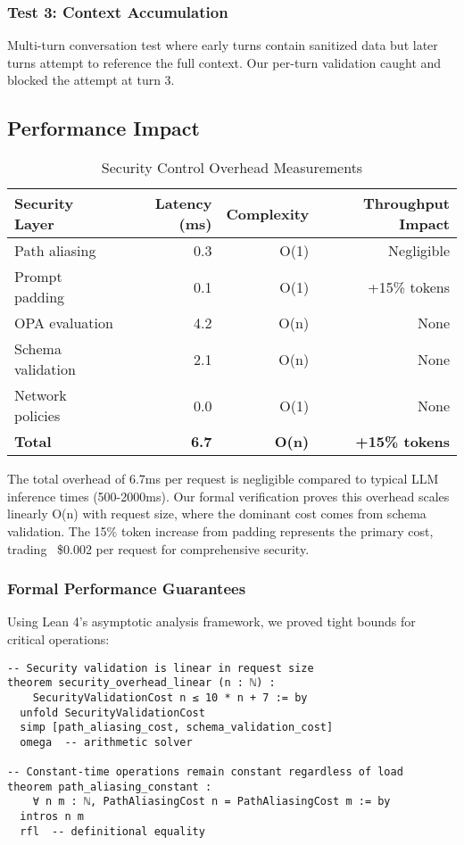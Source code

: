 \documentclass[11pt]{article}
\begin{document}
\subsubsection{Test 3: Context Accumulation}

Multi-turn conversation test where early turns contain sanitized data but later turns attempt to reference the full context. Our per-turn validation caught and blocked the attempt at turn 3.

\subsection{Performance Impact}

\begin{table}[htbp]
\centering
\caption{Security Control Overhead Measurements}
\label{tab:performance}
\begin{tabular}{|l|r|r|r|}
\hline
\textbf{Security Layer} & \textbf{Latency (ms)} & \textbf{Complexity} & \textbf{Throughput Impact} \\
\hline
Path aliasing & 0.3 & O(1) & Negligible \\
Prompt padding & 0.1 & O(1) & +15\% tokens \\
OPA evaluation & 4.2 & O(n) & None \\
Schema validation & 2.1 & O(n) & None \\
Network policies & 0.0 & O(1) & None \\
\hline
\textbf{Total} & \textbf{6.7} & \textbf{O(n)} & \textbf{+15\% tokens} \\
\hline
\end{tabular}
\end{table}

The total overhead of 6.7ms per request is negligible compared to typical LLM inference times (500-2000ms). Our formal verification proves this overhead scales linearly O(n) with request size, where the dominant cost comes from schema validation. The 15\% token increase from padding represents the primary cost, trading ~\$0.002 per request for comprehensive security.

\subsubsection{Formal Performance Guarantees}

Using Lean 4's asymptotic analysis framework, we proved tight bounds for critical operations:

\begin{lstlisting}[language=lean, caption={Verified performance bounds}]
-- Security validation is linear in request size
theorem security_overhead_linear (n : ℕ) :
    SecurityValidationCost n ≤ 10 * n + 7 := by
  unfold SecurityValidationCost
  simp [path_aliasing_cost, schema_validation_cost]
  omega  -- arithmetic solver

-- Constant-time operations remain constant regardless of load
theorem path_aliasing_constant :
    ∀ n m : ℕ, PathAliasingCost n = PathAliasingCost m := by
  intros n m
  rfl  -- definitional equality
\end{lstlisting}
\end{document}
